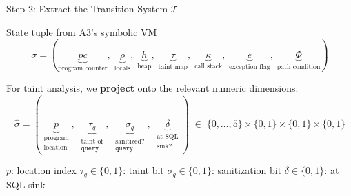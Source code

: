 \documentclass[aspectratio=169]{beamer}
\begin{document}
\begin{frame}{Step 2: Extract the Transition System $\mathcal{T}$}
\begin{block}{State tuple from A3's symbolic VM}
\vspace{-0.5em}
\[
  \sigma = (\underbrace{\mathit{pc}}_{\text{program counter}},\;
            \underbrace{\rho}_{\text{locals}},\;
            \underbrace{h}_{\text{heap}},\;
            \underbrace{\tau}_{\text{taint map}},\;
            \underbrace{\kappa}_{\text{call stack}},\;
            \underbrace{e}_{\text{exception flag}},\;
            \underbrace{\Phi}_{\text{path condition}})
\]
\end{block}

\vspace{0.3em}
For taint analysis, we \textbf{project} onto the relevant numeric dimensions:
\[
  \hat\sigma = (\underbrace{p}_{\substack{\text{program}\\\text{location}}},\;
               \underbrace{\tau_q}_{\substack{\text{taint of}\\\texttt{query}}},\;
               \underbrace{\sigma_q}_{\substack{\text{sanitized?}\\\texttt{query}}},\;
               \underbrace{\delta}_{\substack{\text{at SQL}\\\text{sink?}}})
  \;\in\; \{0,\ldots,5\} \times \{0,1\} \times \{0,1\} \times \{0,1\}
\]

\vspace{0.3em}
\begin{center}
\footnotesize
$p$: location index \quad
$\tau_q \in \{0,1\}$: taint bit \quad
$\sigma_q \in \{0,1\}$: sanitization bit \quad
$\delta \in \{0,1\}$: at SQL sink
\end{center}
\end{frame}
\end{document}
